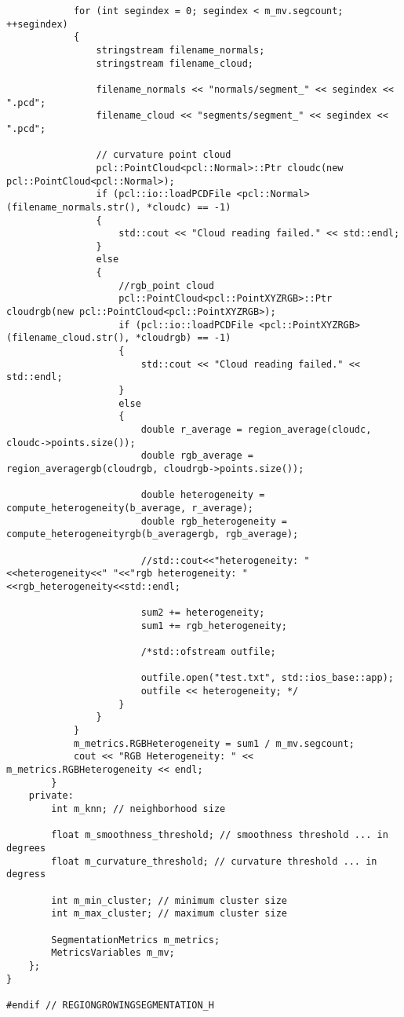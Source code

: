 \begin{lstlisting}
			for (int segindex = 0; segindex < m_mv.segcount; ++segindex)
			{
				stringstream filename_normals;
				stringstream filename_cloud;

				filename_normals << "normals/segment_" << segindex << ".pcd";
				filename_cloud << "segments/segment_" << segindex << ".pcd";

				// curvature point cloud
				pcl::PointCloud<pcl::Normal>::Ptr cloudc(new pcl::PointCloud<pcl::Normal>);
				if (pcl::io::loadPCDFile <pcl::Normal>(filename_normals.str(), *cloudc) == -1)
				{
					std::cout << "Cloud reading failed." << std::endl;
				}
				else
				{
					//rgb_point cloud
					pcl::PointCloud<pcl::PointXYZRGB>::Ptr cloudrgb(new pcl::PointCloud<pcl::PointXYZRGB>);
					if (pcl::io::loadPCDFile <pcl::PointXYZRGB>(filename_cloud.str(), *cloudrgb) == -1)
					{
						std::cout << "Cloud reading failed." << std::endl;
					}
					else
					{
						double r_average = region_average(cloudc, cloudc->points.size());
						double rgb_average = region_averagergb(cloudrgb, cloudrgb->points.size());

						double heterogeneity = compute_heterogeneity(b_average, r_average);
						double rgb_heterogeneity = compute_heterogeneityrgb(b_averagergb, rgb_average);

						//std::cout<<"heterogeneity: "<<heterogeneity<<" "<<"rgb heterogeneity: "<<rgb_heterogeneity<<std::endl;

						sum2 += heterogeneity;
						sum1 += rgb_heterogeneity;

						/*std::ofstream outfile;

						outfile.open("test.txt", std::ios_base::app);
						outfile << heterogeneity; */
					}
				}
			}
			m_metrics.RGBHeterogeneity = sum1 / m_mv.segcount;
			cout << "RGB Heterogeneity: " << m_metrics.RGBHeterogeneity << endl;
		}
	private:
		int m_knn; // neighborhood size

		float m_smoothness_threshold; // smoothness threshold ... in degrees
		float m_curvature_threshold; // curvature threshold ... in degress

		int m_min_cluster; // minimum cluster size
		int m_max_cluster; // maximum cluster size

		SegmentationMetrics m_metrics;
		MetricsVariables m_mv;
	};
}

#endif // REGIONGROWINGSEGMENTATION_H

\end{lstlisting}